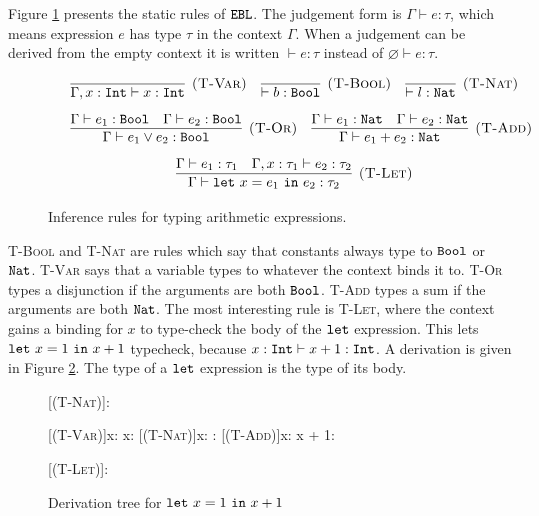 Figure \ref{fig:ebl_static} presents the static rules of $\mathtt{EBL}$. The judgement form is $\Gamma \vdash e: \tau$, which means expression $e$ has type $\tau$ in the context $\Gamma$. When a judgement can be derived from the empty context it is written $\vdash e: \tau$ instead of $\varnothing \vdash e: \tau$.

\begin{figure}[h]

\noindent
{}

\[
\begin{array}{c}

\infer[\textsc{(T-Var)}]
	{\Gamma, x: \kwa{Int} \vdash x: \kwa{Int}}
	{}
~~~
\infer[\textsc{(T-Bool)}]
	{\vdash b : \Bool}
	{}
	~~~
\infer[\textsc{(T-Nat)}]
	{\vdash l : \Nat}
	{}\\[2ex]

	~~~
\infer[\textsc{(T-Or)}]
	{\Gamma \vdash e_1 \lor e_2 : \Bool}
	{\Gamma \vdash e_1: \Bool & \Gamma \vdash e_2: \Bool}
	~~~
\infer[\textsc{(T-Add)}]
	{\Gamma \vdash e_1 + e_2 : \Nat}
	{\Gamma \vdash e_1: \Nat & \Gamma \vdash e_2: \Nat} \\[2ex]
	
\infer[\textsc{(T-Let)}]
	{\Gamma \vdash \letxpr{x}{e_1}{e_2} : \tau_2}
	{\Gamma \vdash e_1: \tau_1 & \Gamma, x: \tau_1 \vdash e_2: \tau_2}
	
	
\end{array}
\]

\vspace{-12pt}
\caption{Inference rules for typing arithmetic expressions.}
\label{fig:ebl_static}
\end{figure}

\textsc{T-Bool} and \textsc{T-Nat} are rules which say that constants always type to $\mathtt{Bool}$ or $\mathtt{Nat}$. \textsc{T-Var} says that a variable types to whatever the context binds it to. \textsc{T-Or} types a disjunction if the arguments are both $\mathtt{Bool}$. \textsc{T-Add} types a sum if the arguments are both $\mathtt{Nat}$. The most interesting rule is \textsc{T-Let}, where the context gains a binding for $x$ to type-check the body of the $\mathtt{let}$ expression. This lets $\mathtt{let}~ x = 1~\mathtt{in}~ x+1$ typecheck, because $x:\mathtt{Int} \vdash x + 1: \mathtt{Int}$. A derivation is given in Figure \ref{fig:ebl_let_tree}. The type of a $\mathtt{let}$ expression is the type of its body.

\begin{figure}[h]


    \begin{prooftree*}
        [\textsc{(T-Nat)}]{: \Nat}
        
        [\textsc{(T-Var)}]{x: \Int \vdash x: \Int}
        [\textsc{(T-Nat)}]{x: \Int {}: \Int }
        [\textsc{(T-Add)}]{x: \Int \vdash x + 1: \Int}
        
        [\textsc{(T-Let)}]{\vdash {}: \Int}
        
 	\end{prooftree*}
 	
\vspace{-12pt}
\caption{Derivation tree for $\mathtt{let}~ x = 1~\mathtt{in}~ x+1$}
\label{fig:ebl_let_tree}
\end{figure}
 
